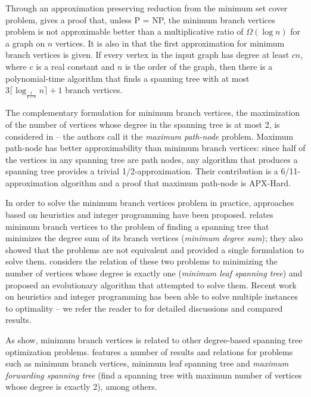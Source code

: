 \documentclass[12pt]{article}
\begin{document}
Through an approximation preserving reduction from the minimum set cover problem, \cite{salamon2010} gives a proof that, unless P = NP, the minimum branch vertices problem is not approximable better than a multiplicative ratio of $\Omega(\log n)$ for a graph on $n$ vertices.
It is also in \cite{salamon2010} that the first approximation for minimum branch vertices is given.
If every vertex in the input graph has degree at least $cn$, where $c$ is a real constant and $n$ is the order of the graph, then there is a polynomial-time algorithm that finds a spanning tree with at most $3\lceil \log_{\frac{1}{1 - c}}n\rceil + 1$ branch vertices. 

The complementary formulation for minimum branch vertices, the maximization of the number of vertices whose degree in the spanning tree is at most 2, is considered in \cite{chimani2015} -- the authors call it the \emph{maximum path-node} problem. 
Maximum path-node has better approximability than minimum branch vertices: since half of the vertices in any spanning tree are path nodes, any algorithm that produces a spanning tree provides a trivial 1/2-approximation.
Their contribution is a 6/11-approximation algorithm and a proof that maximum path-node is APX-Hard.

In order to solve the minimum branch vertices problem in practice, approaches based on heuristics and integer programming have been proposed.
\cite{cerulli2009} relates minimum branch vertices to the problem of finding a spanning tree that minimizes the degree sum of its branch vertices (\emph{minimum degree sum}); they also showed that the problems are not equivalent and provided a single formulation to solve them.
\cite{cerrone2014} considers the relation of these two problems to minimizing the number of vertices whose degree is exactly one (\emph{minimum leaf spanning tree}) and proposed an evolutionary algorithm that attempted to solve them.
Recent work on heuristics and integer programming has been able to solve multiple instances to optimality -- we refer the reader to \cite{marin2015, melo2016, silvestri2017} for detailed discussions and compared results.

As \cite{cerulli2009, cerrone2014} show, minimum branch vertices is related to other degree-based spanning tree optimization problems.
\cite{salamon2010} features a number of results and relations for problems such as minimum branch vertices, minimum leaf spanning tree and \emph{maximum forwarding spanning tree} (find a spanning tree with maximum number of vertices whose degree is exactly 2), among others.
\end{document}
